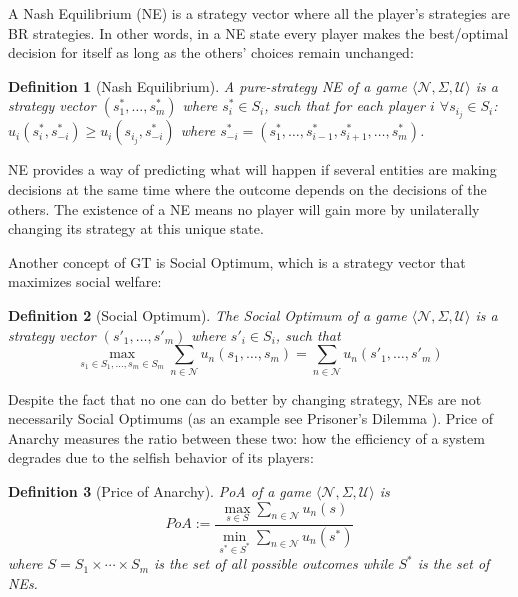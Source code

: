 \documentclass[USenglish,oneside,twocolumn]{article}
\theoremstyle{plain}
\newtheorem*{definition*}{Definition}
\begin{document}
    A Nash Equilibrium (NE) is a strategy vector where all the player's strategies are BR strategies. In other words, in a NE state every player makes the best/optimal decision for itself as long as the others' choices remain unchanged:
    
    \vspace{-0.25cm}
    \begin{definition*}[Nash Equilibrium]
        A pure-strategy NE of a game $\langle\mathcal{N},\Sigma,\mathcal{U}\rangle$ is a strategy vector $(s_1^*,\dots,s_m^*)$ where $s_i^*\in S_i$, such that for each player $i$ $\forall s_{i_j}\in S_i$: $u_i(s_i^*,s_{-i}^*)\geq u_i(s_{i_j},s_{-i}^*)$ where $s_{-i}^*=(s_1^*,\dots,s_{i-1}^*,s_{i+1}^*,\dots,s_m^*)$.
    \end{definition*}
    \vspace{-0.25cm}
    
    NE provides a way of predicting what will happen if several entities are making decisions at the same time where the outcome depends on the decisions of the others. The existence of a NE means no player will gain more by unilaterally changing its strategy at this unique state. 
    
    Another concept of GT is Social Optimum, which is a strategy vector that maximizes social welfare:
    
    \vspace{-0.25cm}
    \begin{definition*}[Social Optimum]
        The Social Optimum of a game $\langle\mathcal{N},\Sigma,\mathcal{U}\rangle$ is a strategy vector $(s'_1,\dots,s'_m)$ where $s'_i\in S_i$, such that
        \vspace{-0.1cm}
        \begin{equation*}
        \max_{s_1\in S_1,\dots,s_m\in S_m}\sum_{n\in\mathcal{N}}u_n(s_1,\dots,s_m)=\sum_{n\in\mathcal{N}}u_n(s'_1,\dots,s'_m)
        \end{equation*}
    \end{definition*}
    \vspace{-0.25cm}
    
    Despite the fact that no one can do better by changing strategy, NEs are not necessarily Social Optimums (as an example see Prisoner's Dilemma \cite{harsanyi1988general}). Price of Anarchy \cite{koutsoupias1999worst} measures the ratio between these two: how the efficiency of a system degrades due to the selfish behavior of its players:
    
    \vspace{-0.25cm}
    \begin{definition*}[Price of Anarchy]
        PoA of a game $\langle\mathcal{N},\Sigma,\mathcal{U}\rangle$ is
        \vspace{-0.1cm}
        \begin{equation*}
        PoA:=\frac{\max_{s\in S}\sum_{n\in \mathcal{N}}u_n(s)}{\min_{s^*\in S^*}\sum_{n\in \mathcal{N}}u_n(s^*)}
        \end{equation*}
        where $S=S_1\times\cdots\times S_m$ is the set of all possible outcomes while $S^*$ is the set of NEs.
    \end{definition*}
    \vspace{-0.25cm}
\end{document}
